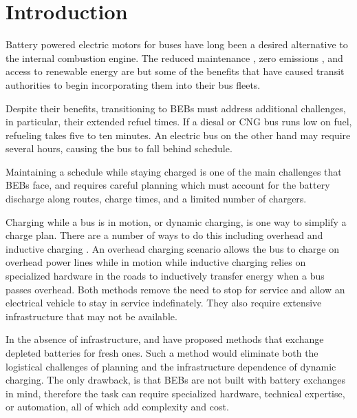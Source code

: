 \section{Introduction}
\par  Battery powered electric motors for buses have long been a desired alternative to the internal combustion engine. The reduced maintenance \cite{poornesh_comparative_2020}, zero emissions \cite{kato_comparative_2013}, and access to renewable energy \cite{cheng_smart_2020} are but some of the benefits that have caused transit authorities to begin incorporating them into their bus fleets.  
\par Despite their benefits, transitioning to BEBs must address additional challenges, in particular, their extended refuel times. If a diesal or CNG bus runs low on fuel, refueling takes five to ten minutes.  An electric bus on the other hand may require several hours, causing the bus to fall behind schedule.
\par Maintaining a schedule while staying charged is one of the main challenges that BEBs face, and requires careful planning which must account for the battery discharge along routes, charge times, and a limited number of chargers. 
\par Charging while a bus is in motion, or dynamic charging, is one way to simplify a charge plan. There are a number of ways to do this including overhead \cite{csonka_optimization_2021} and inductive charging\cite{jeong_automatic_2018} \cite{balde_electric_2019}. An overhead charging scenario allows the bus to charge on overhead power lines while in motion while inductive charging relies on specialized hardware in the roads to inductively transfer energy when a bus passes overhead. Both methods remove the need to stop for service and allow an electrical vehicle to stay in service indefinately. They also require extensive infrastructure that may not be available.
\par In the absence of infrastructure, \cite{jain_battery_2020} and \cite{xian_zhang_optimal_2016} have proposed methods that exchange depleted batteries for fresh ones. Such a method would eliminate both the logistical challenges of planning and the infrastructure dependence of dynamic charging. The only drawback, is that BEBs are not built with battery exchanges in mind, therefore the task can require specialized hardware, technical expertise, or automation, all of which add complexity and cost.

